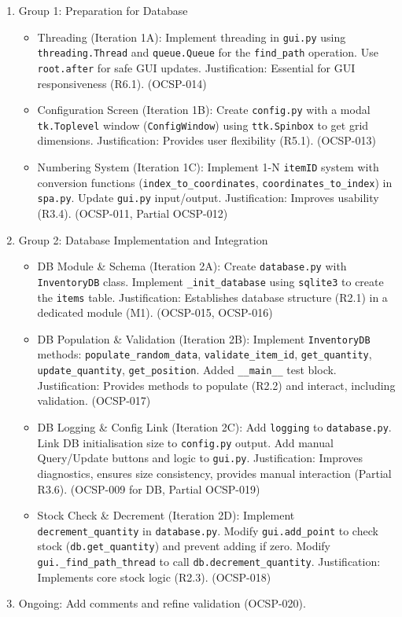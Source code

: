 \begin{enumerate}
	\item Group 1: Preparation for Database
	\begin{itemize}
		\item Threading (Iteration 1A): Implement threading in \verb|gui.py| using \verb|threading.Thread| and \verb|queue.Queue| for the \verb|find_path| operation. Use \verb|root.after| for safe GUI updates. Justification: Essential for GUI responsiveness (R6.1). (OCSP-014)
		\item Configuration Screen (Iteration 1B): Create \verb|config.py| with a modal \verb|tk.Toplevel| window (\verb|ConfigWindow|) using \verb|ttk.Spinbox| to get grid dimensions. Justification: Provides user flexibility (R5.1). (OCSP-013)
		\item Numbering System (Iteration 1C): Implement 1-N \verb|itemID| system with conversion functions (\verb|index_to_coordinates|, \verb|coordinates_to_index|) in \verb|spa.py|. Update \verb|gui.py| input/output. Justification: Improves usability (R3.4). (OCSP-011, Partial OCSP-012)
	\end{itemize}
	\item Group 2: Database Implementation and Integration
	\begin{itemize}
		\item DB Module \& Schema (Iteration 2A): Create \verb|database.py| with \verb|InventoryDB| class. Implement \verb|_init_database| using \verb|sqlite3| to create the \verb|items| table. Justification: Establishes database structure (R2.1) in a dedicated module (M1). (OCSP-015, OCSP-016)
		\item DB Population \& Validation (Iteration 2B): Implement \verb|InventoryDB| methods: \verb|populate_random_data|, \verb|validate_item_id|, \verb|get_quantity|, \verb|update_quantity|, \verb|get_position|. Added \verb|__main__| test block. Justification: Provides methods to populate (R2.2) and interact, including validation. (OCSP-017)
		\item DB Logging \& Config Link (Iteration 2C): Add \verb|logging| to \verb|database.py|. Link DB initialisation size to \verb|config.py| output. Add manual Query/Update buttons and logic to \verb|gui.py|. Justification: Improves diagnostics, ensures size consistency, provides manual interaction (Partial R3.6). (OCSP-009 for DB, Partial OCSP-019)
		\item Stock Check \& Decrement (Iteration 2D): Implement \verb|decrement_quantity| in \verb|database.py|. Modify \verb|gui.add_point| to check stock (\verb|db.get_quantity|) and prevent adding if zero. Modify \verb|gui._find_path_thread| to call \verb|db.decrement_quantity|. Justification: Implements core stock logic (R2.3). (OCSP-018)
	\end{itemize}
	\item Ongoing: Add comments and refine validation (OCSP-020).
\end{enumerate}

